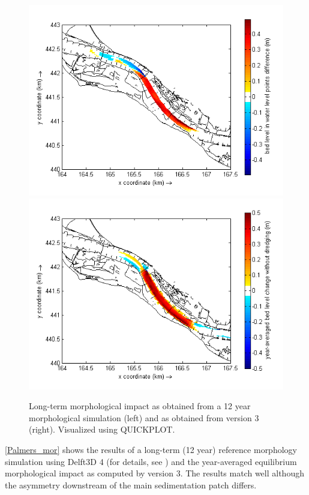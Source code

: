 \begin{figure}
\includegraphics[width=\columnwidth/2]{figures/Palmerswaard_delft3d.png}
\includegraphics[width=\columnwidth/2]{figures/Palmerswaard_dfastmi.png}
\caption{Long-term morphological impact as obtained from a 12 year morphological simulation (left) and as obtained from \dfmi version 3 (right).
Visualized using QUICKPLOT.}
\label{Palmers_mor}
\end{figure}

\autoref{Palmers_mor} shows the results of a long-term (12 year) reference morphology simulation using Delft3D 4 (for details, see \citet{GiriJagers2022}) and the year-averaged equilibrium morphological impact as computed by \dfmi version 3.
The results match well although the asymmetry downstream of the main sedimentation patch differs.


